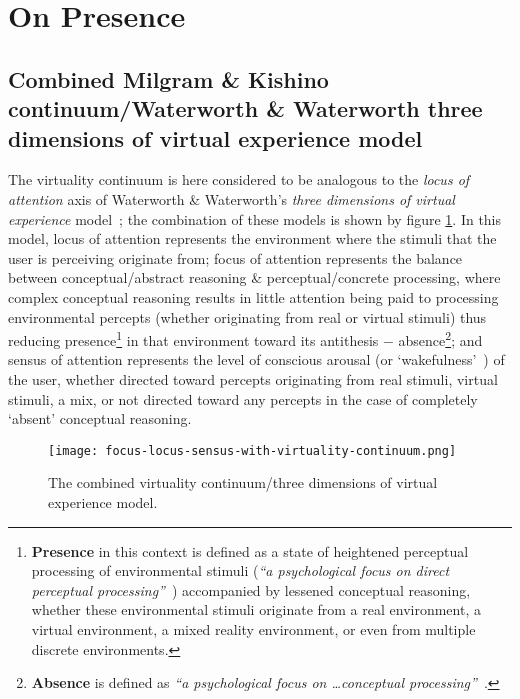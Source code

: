 \section{On Presence}

\subsection{Combined Milgram \& Kishino continuum/Waterworth \& Waterworth three dimensions of virtual experience model}

\newcommand{\presencefootnote}{\footnote{\textbf{Presence} in this context is defined as a state of heightened perceptual processing of environmental stimuli (\textit{``a psychological focus on direct perceptual processing''}~\cite{Waterworth2001}) accompanied by lessened conceptual reasoning, whether these environmental stimuli originate from a real environment, a virtual environment, a mixed reality environment, or even from multiple discrete environments.}}

\newcommand{\absencefootnote}{\footnote{\textbf{Absence} is defined as \textit{``a psychological focus on \ldots conceptual processing''}~\cite{Waterworth2001}.}}

The virtuality continuum is here considered to be analogous to the \textit{locus of attention} axis of Waterworth \& Waterworth's \textit{three dimensions of virtual experience} model~\cite{Waterworth2001}; the combination of these models is shown by figure \ref{focus-locus-sensus-with-virtuality-continuum}. In this model, locus of attention represents the environment where the stimuli that the user is perceiving originate from; focus of attention represents the balance between conceptual/abstract reasoning \& perceptual/concrete processing, where complex conceptual reasoning results in little attention being paid to processing environmental percepts (whether originating from real or virtual stimuli) thus reducing presence\presencefootnote{} in that environment toward its antithesis $-$ absence\absencefootnote{}; and sensus of attention represents the level of conscious arousal (or `wakefulness'~\cite{Laureys2009}) of the user, whether directed toward percepts originating from real stimuli, virtual stimuli, a mix, or not directed toward any percepts in the case of completely `absent' conceptual reasoning.

\begin{figure}[h]
	\begin{center}
		\texttt{[image: focus-locus-sensus-with-virtuality-continuum.png]}
		\caption{The combined virtuality continuum/three dimensions of virtual experience model.}
		\label{focus-locus-sensus-with-virtuality-continuum}
	\end{center}	
\end{figure}

